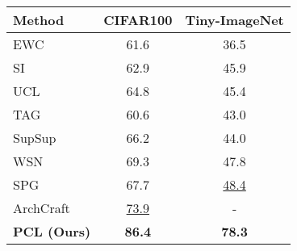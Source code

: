 \begin{tabular}{@{\kern0.5em}lcc@{\kern0.5em}}
    \toprule
    \textbf{Method} &\textbf{CIFAR100} &\textbf{Tiny-ImageNet} \\
    \midrule \midrule
    EWC \cite{ewc} &61.6 &36.5 \\
    SI \cite{si} &62.9 &45.9 \\
    UCL \cite{ucl} &64.8 &45.4 \\
    TAG \cite{tag} &60.6 &43.0 \\
    SupSup \cite{supsup} &66.2 &44.0 \\
    WSN \cite{wsn} &69.3 &47.8 \\
    SPG \cite{spg} &67.7 &\underline{48.4} \\
    \midrule
    ArchCraft \cite{CL_design} &\underline{73.9} &- \\
    \rowcolor{black!5}
    \textbf{PCL (Ours)} &\textbf{86.4} &\textbf{78.3} \\
    \bottomrule \bottomrule
\end{tabular}
